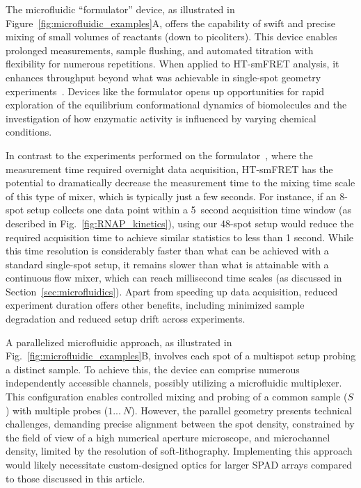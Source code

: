 The microfluidic \enquote{formulator} device, as illustrated in Figure~\ref{fig:microfluidic_examples}A, offers the capability of swift and precise mixing of small volumes of reactants (down to picoliters). 
This device enables prolonged measurements, sample flushing, and automated titration with flexibility for numerous repetitions. 
When applied to \ac{HT-smFRET} analysis, it enhances throughput beyond what was achievable in single-spot geometry experiments~\cite{kim_NM_2011}. 
Devices like the formulator opens up opportunities for rapid exploration of the equilibrium conformational dynamics of biomolecules and the investigation of how enzymatic activity is influenced by varying chemical conditions.

In contrast to the experiments performed on the formulator~\cite{kim_NM_2011}, where the measurement time required overnight data acquisition, \ac{HT-smFRET} has the potential to dramatically decrease the measurement time to the mixing time scale of this type of mixer, which is typically just a few seconds. 
For instance, if an 8-spot setup collects one data point within a 5~second acquisition time window (as described in Fig.~\ref{fig:RNAP_kinetics}), using our 48-spot setup would reduce the required acquisition time to achieve similar statistics to less than 1 second. 
While this time resolution is considerably faster than what can be achieved with a standard single-spot setup, it remains slower than what is attainable with a continuous flow mixer, which can reach millisecond time scales (as discussed in Section~\ref{sec:microfluidics}). 
Apart from speeding up data acquisition, reduced experiment duration offers other benefits, including minimized sample degradation and reduced setup drift across experiments.

A parallelized microfluidic approach, as illustrated in Fig.~\ref{fig:microfluidic_examples}B, involves each spot of a multispot setup probing a distinct sample. 
To achieve this, the device can comprise numerous independently accessible channels, possibly utilizing a microfluidic multiplexer. 
This configuration enables controlled mixing and probing of a common sample ($S$) with multiple probes ($1...~N$). 
However, the parallel geometry presents technical challenges, demanding precise alignment between the spot density, constrained by the field of view of a high numerical aperture microscope, and microchannel density, limited by the resolution of soft-lithography. 
Implementing this approach would likely necessitate custom-designed optics for larger \ac{SPAD} arrays compared to those discussed in this article.

